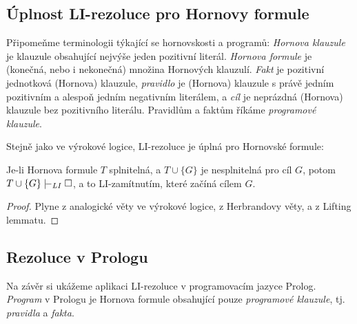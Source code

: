 \subsection{Úplnost LI-rezoluce pro Hornovy formule}

Připomeňme terminologii týkající se hornovskosti a programů: \emph{Hornova klauzule} je klauzule obsahující nejvýše jeden pozitivní literál. \emph{Hornova formule} je (konečná, nebo i nekonečná) množina Hornových klauzulí.
\emph{Fakt} je pozitivní jednotková (Hornova) klauzule, \emph{pravidlo} je (Hornova) klauzule s právě jedním pozitivním a alespoň jedním negativním literálem, a \emph{cíl} je neprázdná (Hornova) klauzule bez pozitivního literálu. Pravidlům a faktům říkáme \emph{programové klauzule}.

Stejně jako ve výrokové logice, LI-rezoluce je úplná pro Hornovské formule:

\begin{theorem}\label{theorem:completeness-of-li-resolution-for-horn-predicate}
Je-li Hornova formule $T$ splnitelná, a $T\cup\{G\}$ je nesplnitelná pro cíl $G$, potom $T\cup\{G\}\proves_{LI}\square$, a to LI-zamítnutím, které začíná cílem $G$.
\end{theorem}
\begin{proof}
    Plyne z analogické věty ve výrokové logice, z Herbrandovy věty, a z Lifting lemmatu.
\end{proof}


\subsection{Rezoluce v Prologu}\label{subsection:resolution-in-prolog}


Na závěr si ukážeme aplikaci LI-rezoluce v programovacím jazyce Prolog. \emph{Program} v Prologu je Hornova formule obsahující pouze \emph{programové klauzule}, tj. \emph{pravidla} a \emph{fakta}.

